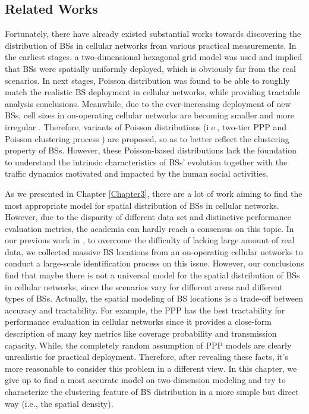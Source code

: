 \subsection{Related Works}
Fortunately, there have already existed substantial works towards discovering the distribution of BSs in cellular networks from various practical measurements. In the earliest stages, a two-dimensional hexagonal grid model \cite{andrews2011tractable} was used and implied that BSs were spatially uniformly deployed, which is obviously far from the real scenarios. In next stages, Poisson distribution \cite{andrews2011tractable,haenggi2009stochastic} was found to be able to roughly match the realistic BS deployment in cellular networks, while providing tractable analysis conclusions. Meanwhile, due to the ever-increasing deployment of new BSs, cell sizes in on-operating cellular networks are becoming smaller and more irregular \cite{andrews2012femtocells}. Therefore, variants of Poisson distributions (i.e., two-tier PPP \cite{zhang2013base} and Poisson clustering process \cite{chun2015modeling}) are proposed, so as to better reflect the clustering property of BSs. However, these Poisson-based distributions lack the foundation to understand the intrinsic characteristics of BSs' evolution together with the traffic dynamics motivated and impacted by the human social activities.

As we presented in Chapter \ref{Chapter3}, there are a lot of work aiming to find the most appropriate model for spatial distribution of BSs in cellular networks. However, due to the disparity of different data set and distinctive performance evaluation metrics, the academia can hardly reach a consensus on this topic. In our previous work in \cite{zhou2015large}, to overcome the difficulty of lacking large amount of real data, we collected massive BS locations from an on-operating cellular networks to conduct a large-scale identification process on this issue. However, our conclusions find that maybe there is not a universal model for the spatial distribution of BSs in cellular networks, since the scenarios vary for different areas and different types of BSs. Actually, the spatial modeling of BS locations is a trade-off between accuracy and tractability. For example, the PPP has the best tractability for performance evaluation in cellular networks since it provides a close-form description of many key metrics like coverage probability and transmission capacity. While, the completely random assumption of PPP models are clearly unrealistic for practical deployment. Therefore, after revealing these facts, it's more reasonable to consider this problem in a different view. In this chapter, we give up to find a most accurate model on two-dimension modeling and try to characterize the clustering feature of BS distribution in a more simple but direct way (i.e., the spatial density).

